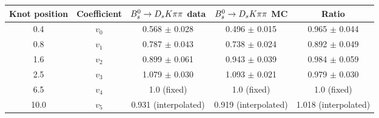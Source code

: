 \begin{tabular}{c c c c c}
\hline
\hline
Knot position & Coefficient & ${{B}^0_{s}}\rightarrow{\ensuremath{{D}_{s}}}{\ensuremath{K}}{\ensuremath{\pi}}{\ensuremath{\pi}}$ data & ${{B}^0_{s}}\rightarrow{\ensuremath{{D}_{s}}}{\ensuremath{K}}{\ensuremath{\pi}}{\ensuremath{\pi}}$ MC & Ratio \\
\hline
0.4 & $v_{0}$ & 0.568 $\pm$ 0.028 & 0.496 $\pm$ 0.015 & 0.965 $\pm$ 0.044\\
0.8 & $v_{1}$ & 0.787 $\pm$ 0.043 & 0.738 $\pm$ 0.024 & 0.892 $\pm$ 0.049\\
1.6 & $v_{2}$ & 0.899 $\pm$ 0.061 & 0.943 $\pm$ 0.039 & 0.984 $\pm$ 0.059\\
2.5 & $v_{3}$ & 1.079 $\pm$ 0.030 & 1.093 $\pm$ 0.021 & 0.979 $\pm$ 0.030\\
6.5 & $v_{4}$ &  1.0 (fixed) & 1.0 (fixed) & 1.0 (fixed)\\
10.0 & $v_{5}$ & 0.931 (interpolated) & 0.919 (interpolated) & 1.018 (interpolated) \\
\hline
\hline
\end{tabular}
